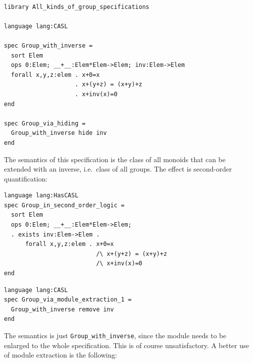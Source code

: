 \documentclass[10pt, a4paper]{isov2}
\newcommand*{\syntax}[1]{\texttt{#1}}
\begin{document}



\begin{lstlisting}[basicstyle=\ttfamily,language=dolText,alsolanguage=CASL,escapechar=@,mathescape]
%prefix( lang: <http://purl.net/DOL/languages/> )%

library All_kinds_of_group_specifications

language lang:CASL

spec Group_with_inverse =
  sort Elem
  ops 0:Elem; __+__:Elem*Elem->Elem; inv:Elem->Elem
  forall x,y,z:elem . x+0=x
                    . x+(y+z) = (x+y)+z
                    . x+inv(x)=0
end

spec Group_via_hiding =
  Group_with_inverse hide inv
end
\end{lstlisting}

The semantics of this specification is the class of all monoids that
can be extended with an inverse, i.e.\ class of all groups. The effect
is second-order quantification:

\begin{lstlisting}[basicstyle=\ttfamily,language=dolText,alsolanguage=CASL,escapechar=@,mathescape]
language lang:HasCASL
spec Group_in_second_order_logic =
  sort Elem
  ops 0:Elem; __+__:Elem*Elem->Elem; 
  . exists inv:Elem->Elem .
      forall x,y,z:elem . x+0=x
                          /\ x+(y+z) = (x+y)+z
                          /\ x+inv(x)=0
end
\end{lstlisting}



\begin{lstlisting}[basicstyle=\ttfamily,language=dolText,alsolanguage=CASL,escapechar=@,mathescape]
language lang:CASL
spec Group_via_module_extraction_1 =
  Group_with_inverse remove inv
end
\end{lstlisting}
The semantics is just \syntax{Group\_with\_inverse},
since the module needs to be enlarged to the whole specification.
This is of course unsatisfactory. A better use of module extraction
is the following:
\end{document}
